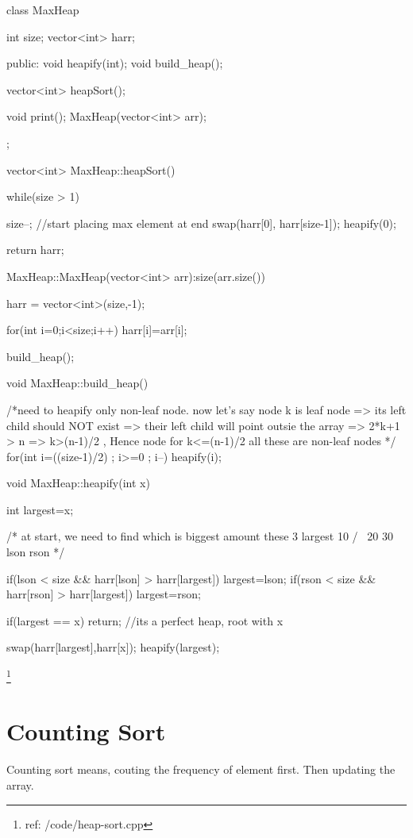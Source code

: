\begin{code3}
     class MaxHeap{
        int size;
        vector<int> harr;
         
    public:
         void heapify(int);
         void build_heap();
    
         vector<int> heapSort();
         
         void print();
         MaxHeap(vector<int> arr);          
    };
    
    vector<int> MaxHeap::heapSort(){
    
        while(size > 1){

          size--;   
          //start placing max element at end       
          swap(harr[0], harr[size-1]); 
          heapify(0);
        }

        return harr;
    }
    
    
    MaxHeap::MaxHeap(vector<int> arr):size(arr.size()){
        
        harr = vector<int>(size,-1);
    
         for(int i=0;i<size;i++)
              harr[i]=arr[i];
         
         build_heap();
    }
    
    void MaxHeap::build_heap(){
         
        /*need to heapify only non-leaf node. now let's say node k is leaf node => its left child should NOT exist => their left child will point outsie the array =>  2*k+1 > n
        => k>(n-1)/2 , Hence node for k<=(n-1)/2 all these are non-leaf nodes */
         for(int i=((size-1)/2) ; i>=0 ; i--){
              heapify(i);
         }
    }
    
    void MaxHeap::heapify(int x){
         int largest=x;
    
    /* at start, we need to find which is biggest amount these 3
                 largest
                    10
                   /  \
                 20    30
                lson   rson
    */
    
        
        if(lson < size && harr[lson] > harr[largest]) largest=lson;
        if(rson < size && harr[rson] > harr[largest]) largest=rson;
    
        if(largest == x) return; //its a perfect heap, root with x
    
        swap(harr[largest],harr[x]); 
        heapify(largest);
    }
\end{code3}
\footnote{ref: /code/heap-sort.cpp}


\section{Counting Sort}
Counting sort means, couting the frequency of element first.
Then updating the array.

